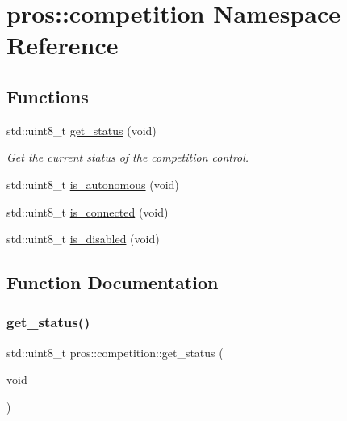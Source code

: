 \hypertarget{namespacepros_1_1competition}{}\section{pros\+::competition Namespace Reference}
\label{namespacepros_1_1competition}
\subsection*{Functions}
\begin{DoxyCompactItemize}
\item 
std\+::uint8\+\_\+t \mbox{\hyperlink{namespacepros_1_1competition_ad75e0e06e0817959c08798358eaa8ab0}{get\+\_\+status}} (void)
\begin{DoxyCompactList}\small\item\em Get the current status of the competition control. \end{DoxyCompactList}\item 
std\+::uint8\+\_\+t \mbox{\hyperlink{namespacepros_1_1competition_a88353a4f8e5e283558ee6504c54283af}{is\+\_\+autonomous}} (void)
\item 
std\+::uint8\+\_\+t \mbox{\hyperlink{namespacepros_1_1competition_aaf36367a2369390657f6bc4285f68c64}{is\+\_\+connected}} (void)
\item 
std\+::uint8\+\_\+t \mbox{\hyperlink{namespacepros_1_1competition_a2d4f4555af4c45f7f82ea75e1223899b}{is\+\_\+disabled}} (void)
\end{DoxyCompactItemize}


\subsection{Function Documentation}
\mbox{\label{namespacepros_1_1competition_ad75e0e06e0817959c08798358eaa8ab0}} 
\subsubsection{\texorpdfstring{get\_status()}{get\_status()}}
{\footnotesize\ttfamily std\+::uint8\+\_\+t pros\+::competition\+::get\+\_\+status (\begin{DoxyParamCaption}\item[{void}]{ }\end{DoxyParamCaption})}



